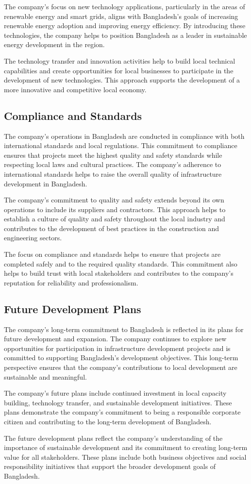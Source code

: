 The company's focus on new technology applications, particularly in the areas of renewable energy and smart grids, aligns with Bangladesh's goals of increasing renewable energy adoption and improving energy efficiency. By introducing these technologies, the company helps to position Bangladesh as a leader in sustainable energy development in the region.

The technology transfer and innovation activities help to build local technical capabilities and create opportunities for local businesses to participate in the development of new technologies. This approach supports the development of a more innovative and competitive local economy.

\subsection{Compliance and Standards}
The company's operations in Bangladesh are conducted in compliance with both international standards and local regulations. This commitment to compliance ensures that projects meet the highest quality and safety standards while respecting local laws and cultural practices. The company's adherence to international standards helps to raise the overall quality of infrastructure development in Bangladesh.

The company's commitment to quality and safety extends beyond its own operations to include its suppliers and contractors. This approach helps to establish a culture of quality and safety throughout the local industry and contributes to the development of best practices in the construction and engineering sectors.

The focus on compliance and standards helps to ensure that projects are completed safely and to the required quality standards. This commitment also helps to build trust with local stakeholders and contributes to the company's reputation for reliability and professionalism.

\subsection{Future Development Plans}
The company's long-term commitment to Bangladesh is reflected in its plans for future development and expansion. The company continues to explore new opportunities for participation in infrastructure development projects and is committed to supporting Bangladesh's development objectives. This long-term perspective ensures that the company's contributions to local development are sustainable and meaningful.

The company's future plans include continued investment in local capacity building, technology transfer, and sustainable development initiatives. These plans demonstrate the company's commitment to being a responsible corporate citizen and contributing to the long-term development of Bangladesh.

The future development plans reflect the company's understanding of the importance of sustainable development and its commitment to creating long-term value for all stakeholders. These plans include both business objectives and social responsibility initiatives that support the broader development goals of Bangladesh.
